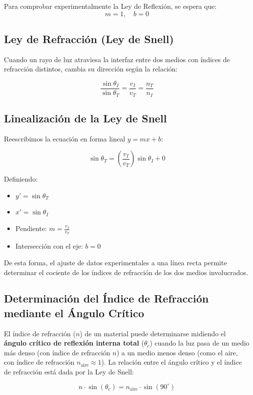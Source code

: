 \documentclass[article,12pt]{elsarticle}
\begin{document}
Para comprobar experimentalmente la Ley de Reflexión, se espera que:
\begin{equation}
m = 1, \quad b = 0
\end{equation}

\subsection*{Ley de Refracción (Ley de Snell)}
Cuando un rayo de luz atraviesa la interfaz entre dos medios con índices de refracción distintos, cambia su dirección según la relación:

\begin{mdframed}
\begin{equation}
\frac{\sin \theta_I}{\sin \theta_T} = \frac{v_I}{v_T} = \frac{n_T}{n_I}
\end{equation}
\end{mdframed}

\subsection*{Linealización de la Ley de Snell}
Reescribimos la ecuación en forma lineal $y = mx + b$:

\begin{mdframed}
\begin{equation}
\sin \theta_T = \left( \frac{v_I}{v_T} \right) \sin \theta_I + 0
\end{equation}
\end{mdframed}

Definiendo:
\begin{itemize}
\item $y' = \sin \theta_T$
\item $x' = \sin \theta_I$
\item Pendiente: $m = \frac{v_I}{v_T}$
\item Intersección con el eje: $b = 0$
\end{itemize}

De esta forma, el ajuste de datos experimentales a una línea recta permite determinar el cociente de los índices de refracción de los dos medios involucrados.

\subsection*{Determinación del Índice de Refracción mediante el Ángulo Crítico}
El índice de refracción ($n$) de un material puede determinarse midiendo el \textbf{ángulo crítico de reflexión interna total} ($\theta_c$) cuando la luz pasa de un medio más denso (con índice de refracción $n$) a un medio menos denso (como el aire, con índice de refracción $n_{\text{aire}} \approx 1$). La relación entre el ángulo crítico y el índice de refracción está dada por la Ley de Snell:
\begin{mdframed}
\begin{equation}
n \cdot \sin(\theta_c) = n_{\text{aire}} \cdot \sin(90^\circ)
\end{equation}
\end{mdframed}
\end{document}
